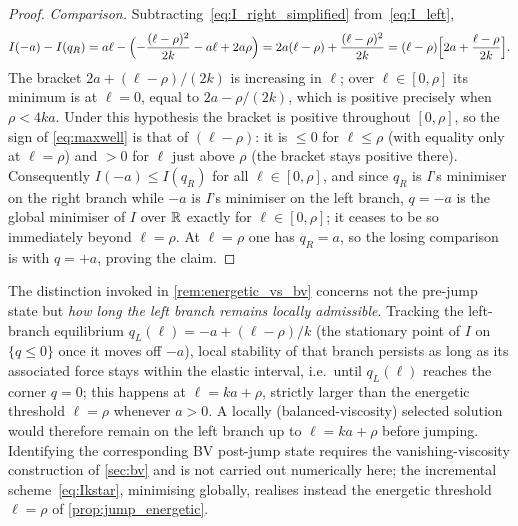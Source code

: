 \begin{proof}
\emph{Comparison.} Subtracting~\eqref{eq:I_right_simplified}
from~\eqref{eq:I_left},
\begin{equation}\label{eq:maxwell}
  I(-a)-I(q_R)
  =a\ell-\Bigl(-\frac{(\ell-\rho)^2}{2k}-a\ell+2a\rho\Bigr)
  =2a(\ell-\rho)+\frac{(\ell-\rho)^2}{2k}
  =(\ell-\rho)\Bigl[2a+\frac{\ell-\rho}{2k}\Bigr].
\end{equation}
The bracket $2a+(\ell-\rho)/(2k)$ is increasing in $\ell$; over
$\ell\in[0,\rho]$ its minimum is at $\ell=0$, equal to
$2a-\rho/(2k)$, which is positive precisely when $\rho<4ka$. Under this
hypothesis the bracket is positive throughout $[0,\rho]$, so the sign of
\eqref{eq:maxwell} is that of $(\ell-\rho)$: it is $\le0$ for
$\ell\le\rho$ (with equality only at $\ell=\rho$) and $>0$ for $\ell$
just above $\rho$ (the bracket stays positive there). Consequently
$I(-a)\le I(q_R)$ for all $\ell\in[0,\rho]$, and since $q_R$ is $I$'s
minimiser on the right branch while $-a$ is $I$'s minimiser on the left
branch, $q=-a$ is the global minimiser of $I$ over $\mathbb{R}$ exactly for
$\ell\in[0,\rho]$; it ceases to be so immediately beyond $\ell=\rho$. At
$\ell=\rho$ one has $q_R=a$, so the losing comparison is with $q=+a$,
proving the claim.
\end{proof}

\begin{remark}\label{rem:local_threshold}
The distinction invoked in \cref{rem:energetic_vs_bv} concerns not the
pre-jump state but \emph{how long the left branch remains locally
admissible}. Tracking the left-branch equilibrium
$q_L(\ell)=-a+(\ell-\rho)/k$ (the stationary point of $I$ on
$\{q\le0\}$ once it moves off $-a$), local stability of that branch
persists as long as its associated force stays within the elastic
interval, i.e.\ until $q_L(\ell)$ reaches the corner $q=0$; this happens
at $\ell=ka+\rho$, strictly larger than the energetic threshold
$\ell=\rho$ whenever $a>0$. A locally (balanced-viscosity) selected
solution would therefore remain on the left branch up to
$\ell=ka+\rho$ before jumping. Identifying the corresponding
BV post-jump state requires the vanishing-viscosity construction of
\cref{sec:bv} and is not carried out numerically here; the incremental
scheme~\eqref{eq:Ikstar}, minimising globally, realises instead the
energetic threshold $\ell=\rho$ of \cref{prop:jump_energetic}.
\end{remark}
\clearpage

